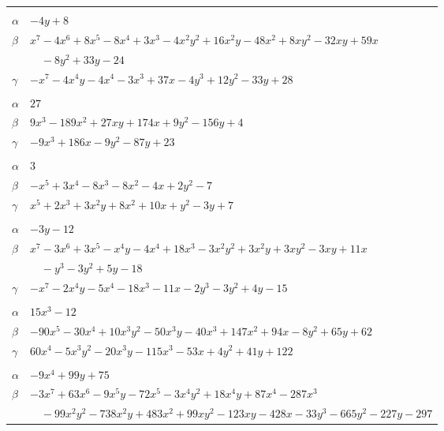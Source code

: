 \documentclass[11pt]{article}
\begin{document}
\begin{longtable}{@{}ll@{}}
\addlinespace[3pt]
\multicolumn{2}{@{}l}{$\{i,j\}=\{44,47\}$, $k_{ij}=2^{2}\cdot 3$}\\
$\alpha$ & $-4y+8$\\
$\beta$ & $x^{7}-4x^{6}+8x^{5}-8x^{4}+3x^{3}-4x^{2}y^{2}+16x^{2}y-48x^{2}+8xy^{2}-32xy+59x$\\
 & $\quad -8y^{2}+33y-24$\\
$\gamma$ & $-x^{7}-4x^{4}y-4x^{4}-3x^{3}+37x-4y^{3}+12y^{2}-33y+28$\\
\addlinespace[3pt]
\multicolumn{2}{@{}l}{$\{i,j\}=\{44,87\}$, $k_{ij}=2^{3}$}\\
$\alpha$ & $27$\\
$\beta$ & $9x^{3}-189x^{2}+27xy+174x+9y^{2}-156y+4$\\
$\gamma$ & $-9x^{3}+186x-9y^{2}-87y+23$\\
\addlinespace[3pt]
\multicolumn{2}{@{}l}{$\{i,j\}=\{45,47\}$, $k_{ij}=2^{3}\cdot 3$}\\
$\alpha$ & $3$\\
$\beta$ & $-x^{5}+3x^{4}-8x^{3}-8x^{2}-4x+2y^{2}-7$\\
$\gamma$ & $x^{5}+2x^{3}+3x^{2}y+8x^{2}+10x+y^{2}-3y+7$\\
\addlinespace[3pt]
\multicolumn{2}{@{}l}{$\{i,j\}=\{45,66\}$, $k_{ij}=2\cdot 3^{3}$}\\
$\alpha$ & $-3y-12$\\
$\beta$ & $x^{7}-3x^{6}+3x^{5}-x^{4}y-4x^{4}+18x^{3}-3x^{2}y^{2}+3x^{2}y+3xy^{2}-3xy+11x$\\
 & $\quad -y^{3}-3y^{2}+5y-18$\\
$\gamma$ & $-x^{7}-2x^{4}y-5x^{4}-18x^{3}-11x-2y^{3}-3y^{2}+4y-15$\\
\addlinespace[3pt]
\multicolumn{2}{@{}l}{$\{i,j\}=\{45,82\}$, $k_{ij}=2^{2}\cdot 3^{3}$}\\
$\alpha$ & $15x^{3}-12$\\
$\beta$ & $-90x^{5}-30x^{4}+10x^{3}y^{2}-50x^{3}y-40x^{3}+147x^{2}+94x-8y^{2}+65y+62$\\
$\gamma$ & $60x^{4}-5x^{3}y^{2}-20x^{3}y-115x^{3}-53x+4y^{2}+41y+122$\\
\addlinespace[3pt]
\multicolumn{2}{@{}l}{$\{i,j\}=\{45,100\}$, $k_{ij}=2^{4}\cdot 3\cdot 11$}\\
$\alpha$ & $-9x^{4}+99y+75$\\
$\beta$ & $-3x^{7}+63x^{6}-9x^{5}y-72x^{5}-3x^{4}y^{2}+18x^{4}y+87x^{4}-287x^{3}$\\
 & $\quad -99x^{2}y^{2}-738x^{2}y+483x^{2}+99xy^{2}-123xy-428x-33y^{3}-665y^{2}-227y-297$\\

\end{longtable}
\end{document}
